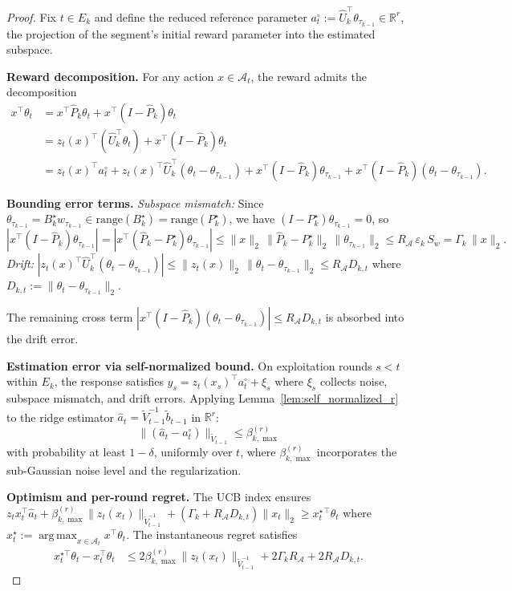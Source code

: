\documentclass{article}
\newcommand{\R}{\mathbb{R}}
\newcommand{\cA}{\mathcal{A}}
\newcommand{\range}{\mathrm{range}}
\DeclareMathOperator*{\argmax}{arg\,max}
\begin{document}
\begin{proof}
Fix $t \in E_k$ and define the reduced reference parameter $a_t^\circ := \widehat U_k^\top \theta_{\tau_{k-1}} \in \R^r$, the projection of the segment's initial reward parameter into the estimated subspace.

\textbf{Reward decomposition.}
For any action $x \in \cA_t$, the reward admits the decomposition
\begin{align*}
x^\top \theta_t
&= x^\top \widehat P_k \theta_t + x^\top (I - \widehat P_k)\theta_t \\
&= z_t(x)^\top (\widehat U_k^\top \theta_t) + x^\top(I - \widehat P_k)\theta_t \\
&= z_t(x)^\top a_t^\circ + z_t(x)^\top \widehat U_k^\top (\theta_t - \theta_{\tau_{k-1}}) + x^\top(I - \widehat P_k)\theta_{\tau_{k-1}} + x^\top(I-\widehat P_k)(\theta_t - \theta_{\tau_{k-1}}).
\end{align*}

\textbf{Bounding error terms.}
\emph{Subspace mismatch:}  Since $\theta_{\tau_{k-1}} = B_k^\star w_{\tau_{k-1}} \in \range(B_k^\star) = \range(P_k^\star)$, we have $(I - P_k^\star)\theta_{\tau_{k-1}} = 0$, so
\[
|x^\top(I - \widehat P_k)\theta_{\tau_{k-1}}|
= |x^\top(\widehat P_k - P_k^\star)\theta_{\tau_{k-1}}|
\le \|x\|_2\,\|\widehat P_k - P_k^\star\|_2\,\|\theta_{\tau_{k-1}}\|_2
\le R_{\cA}\,\varepsilon_k\,S_w = \Gamma_k\,\|x\|_2.
\]
\emph{Drift:}  $|z_t(x)^\top \widehat U_k^\top(\theta_t - \theta_{\tau_{k-1}})| \le \|z_t(x)\|_2\,\|\theta_t - \theta_{\tau_{k-1}}\|_2 \le R_{\cA} D_{k,t}$ where $D_{k,t} := \|\theta_t - \theta_{\tau_{k-1}}\|_2$.

The remaining cross term $|x^\top(I-\widehat P_k)(\theta_t - \theta_{\tau_{k-1}})| \le R_{\cA} D_{k,t}$ is absorbed into the drift error.

\textbf{Estimation error via self-normalized bound.}
On exploitation rounds $s < t$ within $E_k$, the response satisfies $y_s = z_t(x_s)^\top a_t^\circ + \xi_s$ where $\xi_s$ collects noise, subspace mismatch, and drift errors.  Applying Lemma~\ref{lem:self_normalized_r} to the ridge estimator $\widehat a_t = \widetilde V_{t-1}^{-1} \widetilde b_{t-1}$ in $\R^r$:
\[
\|(\widehat a_t - a_t^\circ)\|_{\widetilde V_{t-1}} \le \beta_{k,\max}^{(r)}
\]
with probability at least $1-\delta$, uniformly over $t$, where $\beta_{k,\max}^{(r)}$ incorporates the sub-Gaussian noise level and the regularization.

\textbf{Optimism and per-round regret.}
The UCB index ensures $z_tx_t^\top \widehat a_t + \beta_{k,\max}^{(r)}\|z_t(x_t)\|_{\widetilde V_{t-1}^{-1}} + (\Gamma_k + R_{\cA} D_{k,t})\|x_t\|_2 \ge x_t^\star{}^\top \theta_t$ where $x_t^\star := \argmax_{x \in \cA_t} x^\top \theta_t$.  The instantaneous regret satisfies
\begin{align*}
x_t^{\star\top}\theta_t - x_t^\top\theta_t
&\le 2\beta_{k,\max}^{(r)}\|z_t(x_t)\|_{\widetilde V_{t-1}^{-1}} + 2\Gamma_k R_{\cA} + 2R_{\cA} D_{k,t}.
\end{align*}


\end{proof}
\end{document}
